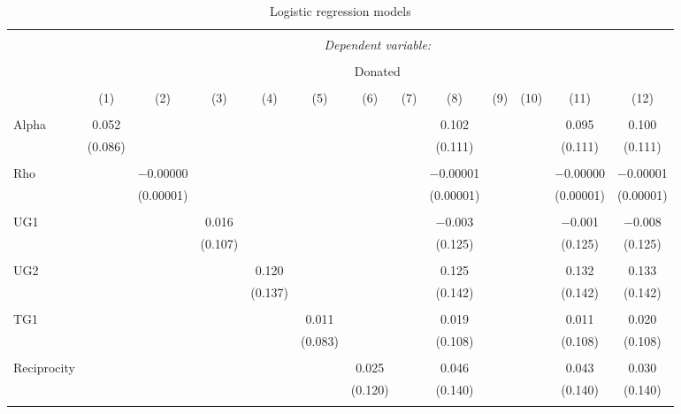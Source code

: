 \documentclass[12pt]{article}
\begin{document}
\begin{table}[!htbp] \centering 
  \caption{Logistic regression models} 
  \label{} 
  \begin{adjustbox}{width=\textwidth}
\begin{tabular}{@{\extracolsep{5pt}}lcccccccccccc} 
\\[-1.8ex]\hline 
\hline \\[-1.8ex] 
 & \multicolumn{12}{c}{\textit{Dependent variable:}} \\ 
\cline{2-13} 
\\[-1.8ex] & \multicolumn{12}{c}{Donated} \\ 
\\[-1.8ex] & (1) & (2) & (3) & (4) & (5) & (6) & (7) & (8) & (9) & (10) & (11) & (12)\\ 
\hline \\[-1.8ex] 
 Alpha & 0.052 &  &  &  &  &  &  & 0.102 &  &  & 0.095 & 0.100 \\ 
  & (0.086) &  &  &  &  &  &  & (0.111) &  &  & (0.111) & (0.111) \\ 
  & & & & & & & & & & & & \\ 
 Rho &  & $-$0.00000 &  &  &  &  &  & $-$0.00001 &  &  & $-$0.00000 & $-$0.00001 \\ 
  &  & (0.00001) &  &  &  &  &  & (0.00001) &  &  & (0.00001) & (0.00001) \\ 
  & & & & & & & & & & & & \\ 
 UG1 &  &  & 0.016 &  &  &  &  & $-$0.003 &  &  & $-$0.001 & $-$0.008 \\ 
  &  &  & (0.107) &  &  &  &  & (0.125) &  &  & (0.125) & (0.125) \\ 
  & & & & & & & & & & & & \\ 
 UG2 &  &  &  & 0.120 &  &  &  & 0.125 &  &  & 0.132 & 0.133 \\ 
  &  &  &  & (0.137) &  &  &  & (0.142) &  &  & (0.142) & (0.142) \\ 
  & & & & & & & & & & & & \\ 
 TG1 &  &  &  &  & 0.011 &  &  & 0.019 &  &  & 0.011 & 0.020 \\ 
  &  &  &  &  & (0.083) &  &  & (0.108) &  &  & (0.108) & (0.108) \\ 
  & & & & & & & & & & & & \\ 
 Reciprocity &  &  &  &  &  & 0.025 &  & 0.046 &  &  & 0.043 & 0.030 \\ 
  &  &  &  &  &  & (0.120) &  & (0.140) &  &  & (0.140) & (0.140) \\ 
  & & & & & & & & & & & & \\ 

\end{tabular}
\end{adjustbox}
\end{table}
\end{document}
